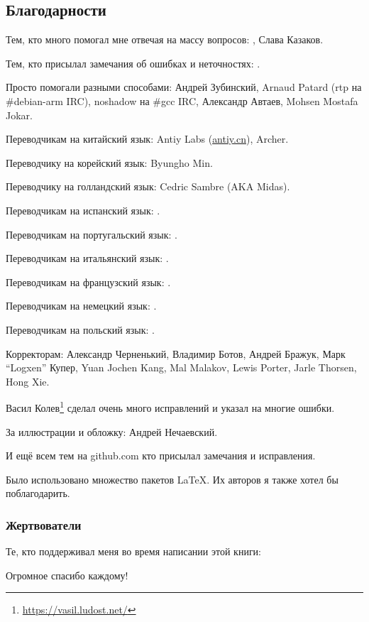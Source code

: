 \subsection*{Благодарности}

Тем, кто много помогал мне отвечая на массу вопросов: \HERMIT, Слава  Казаков.

Тем, кто присылал замечания об ошибках и неточностях: \PeopleMistakesInaccuracies{}.

Просто помогали разными способами:
Андрей Зубинский,
Arnaud Patard (rtp на \#debian-arm IRC),
noshadow на \#gcc IRC,
Александр Автаев,
Mohsen Mostafa Jokar.

Переводчикам на китайский язык:
Antiy Labs (\href{http://antiy.cn}{antiy.cn}), Archer.

Переводчику на корейский язык: Byungho Min.

Переводчику на голландский язык: Cedric Sambre (AKA Midas).

Переводчикам на испанский язык: \PeopleSpanishTranslators{}.

Переводчикам на португальский язык: \PeoplePTBRTranslators{}.

Переводчикам на итальянский язык: \PeopleItalianTranslators{}.

Переводчикам на французский язык: \PeopleFrenchTranslators{}.

Переводчикам на немецкий язык: \PeopleGermanTranslators{}.

Переводчикам на польский язык: \PeoplePolishTranslators{}.

Корректорам:
Александр  Черненький,
Владимир Ботов,
Андрей Бражук,
Марк ``Logxen'' Купер, Yuan Jochen Kang, Mal Malakov, Lewis Porter, Jarle Thorsen, Hong Xie.

Васил Колев\footnote{\url{https://vasil.ludost.net/}} сделал очень много исправлений и указал на многие ошибки.

За иллюстрации и обложку: Андрей Нечаевский.

И ещё всем тем на github.com кто присылал замечания и исправления\FNGithubContributors{}.

Было использовано множество пакетов \LaTeX. Их авторов я также хотел бы поблагодарить.

\subsubsection*{Жертвователи}

Те, кто поддерживал меня во время написании этой книги:



Огромное спасибо каждому!

